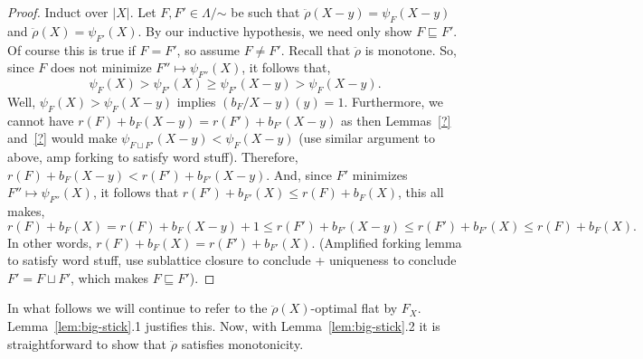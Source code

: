 \documentclass[11pt]{article}
\newcommand{\glang}{\Lambda}
\newcommand{\greedyrep}{\ddot{\rho}}
\begin{document}
\begin{proof}
    Induct over $|X|$.
    Let $F,F' \in\glang/\mathord{\sim}$ be such that $\greedyrep(X - y) = \psi_F(X-y)$ and $\greedyrep(X) = \psi_{F'}(X)$.
    By our inductive hypothesis, we need only show $F\sqsubseteq F'$.
    Of course this is true if $F=F'$, so assume $F\neq F'$.
    Recall that $\greedyrep$ is monotone.
    So, since $F$ does not minimize $F''\mapsto\psi_{F''}(X)$, it follows that,
    $$\psi_F(X) > \psi_{F'}(X) \geq \psi_{F'}(X-y) > \psi_{F}(X-y).$$
    Well, $\psi_F(X) >\psi_{F}(X-y)$ implies $\left(b_F/X-y\right)(y) = 1$.
    Furthermore, we cannot have $r(F) + b_F(X - y) = r(F') + b_{F'}(X-y)$ as then Lemmas~\ref{?} and~\ref{?} would make $\psi_{F\sqcup F'}(X-y) < \psi_{F}(X-y)$ (use similar argument to above, amp forking to satisfy word stuff).
    Therefore, $r(F) + b_F(X - y) < r(F') + b_{F'}(X-y)$.
    And, since $F'$ minimizes $F''\mapsto \psi_{F''}(X)$, it follows that $r(F') + b_{F'}(X) \leq r(F) + b_{F}(X)$, this all makes,
    \[
        r(F) + b_{F}(X) = r(F) + b_F(X - y) + 1 \leq r(F') + b_{F'}(X-y) \leq r(F') + b_{F'}(X) \leq r(F) + b_{F}(X).
    \]
    In other words, $r(F) + b_{F}(X) = r(F') + b_{F'}(X)$.
    (Amplified forking lemma to satisfy word stuff, use sublattice closure to conclude + uniqueness to conclude $F' = F\sqcup F'$, which makes $F\sqsubseteq F'$).
\fi 
\end{proof}

In what follows we will continue to refer to the $\greedyrep(X)$-optimal flat by $F_X$.
Lemma~\ref{lem:big-stick}.1 justifies this.
Now, with Lemma~\ref{lem:big-stick}.2 it is straightforward to show that $\greedyrep$ satisfies monotonicity.
\end{document}
